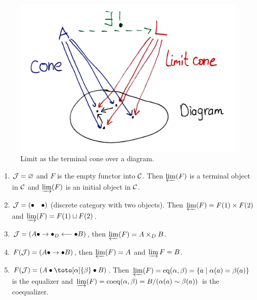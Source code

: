 \begin{figure}[tp]
    \centering
    \includegraphics[scale=0.15]{figures/limits.png}
    \caption{Limit as the terminal cone over a diagram.}
    \label{fig:limits}
\end{figure}
    
\begin{example}
\begin{enumerate}
    \item $\mathcal{J}=\varnothing$ and $F$ is the empty functor into $\mathcal{C}$. Then $\varprojlim(F)$ is a terminal object in $\mathcal{C}$ and $\varinjlim(F)$ is an initial object in $\mathcal{C}$.
    \item $\mathcal{J}=(\bullet\quad\bullet)$ (discrete category with two objects). Then $\varprojlim(F)=F(1)\times F(2)$ and $\varinjlim(F)=F(1)\sqcup F(2)$.
    \item $\mathcal{J}=(A\bullet\to \bullet_D\longleftarrow \bullet B)$, then $\varprojlim(F)=A\times_D B$.
    \item $F(\mathcal{J})=(A\bullet\to \bullet B)$, then $\varprojlim(F)=A$ and $\varinjlim{F}=B$.
    \item $F(\calJ)=(A\bullet\toto[\alpha]{\beta}\bullet B)$. Then $\varprojlim(F)=\mathrm{eq}(\alpha,\beta)=\{a\mid \alpha(a)=\beta(a)\}$ is the equalizer and $\varinjlim(F)=\mathrm{coeq}(\alpha,\beta)=B/(\alpha(a)\sim \beta(a))$ is the coequalizer.

\end{enumerate}
\end{example} 

